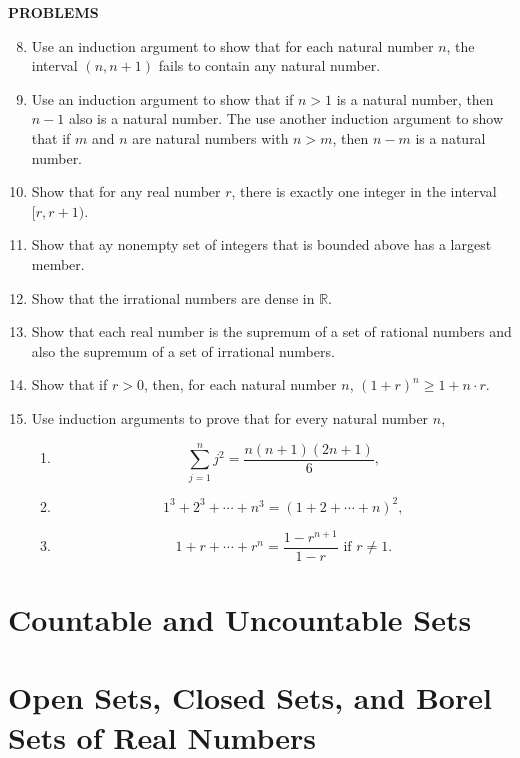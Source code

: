 \documentclass[a4paper,10pt]{book}
\theoremstyle{plain} %
\begin{document}
\begin{center}
	\textbf{PROBLEMS}
\end{center}
\begin{enumerate}
	\setcounter{enumi}{7}
	\item Use an induction argument to show that for each natural number $n$, the interval $(n, n+1)$ fails to contain any natural number.
	\item Use an induction argument to show that if $n>1$ is a natural number, then $n-1$ also is a natural number. The use another induction argument to show that if $m$ and $n$ are natural numbers with $n>m$, then $n-m$ is a natural number.
	\item Show that for any real number $r$, there is exactly one integer in the interval $[r,r+1)$.
	\item Show that ay nonempty set of integers that is bounded above has a largest member.
	\item Show that the irrational numbers are dense in $\mathbb{R}$.
	\item Show that each real number is the supremum of a set of rational numbers and also the supremum of a set of irrational numbers.
	\item Show that if $r>0$, then, for each natural number $n$, $(1+r)^n \ge 1+n \cdot r$.
	\item Use induction arguments to prove that for every natural number $n$,
	\begin{enumerate}[label=(\roman*),align=left]
        \item \[ \sum_{j=1}^n j^2 = \dfrac{n(n+1)(2n+1)}{6}, \]
        \item \[ 1^3 + 2^3 + \cdots + n^3 = (1+2+\cdots +n)^2, \]
        \item \[ 1+r+\cdots +r^n = \dfrac{1-r^{n+1}}{1-r} \text{ if } r \neq 1.\]
    \end{enumerate}
\end{enumerate}

\section{Countable and Uncountable Sets}
\section{Open Sets, Closed Sets, and Borel Sets of Real Numbers}
\end{document}
